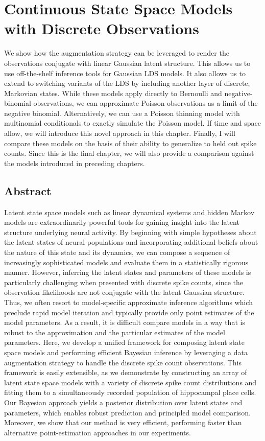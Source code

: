 \chapter{Continuous State Space Models with Discrete Observations}
\label{chap:eight}

We show how the \polyagamma augmentation strategy can be leveraged 
to render the observations conjugate with linear Gaussian latent structure. 
This allows us to use off-the-shelf inference tools for Gaussian LDS 
models. It also allows us to extend to switching variants of the LDS 
by including another layer of discrete, Markovian states. 
While these models apply directly to Bernoulli and negative-binomial 
observations, we can approximate Poisson observations as a limit of the 
negative binomial. Alternatively, we can use a Poisson thinning model with 
multinomial conditionals to exactly simulate the Poisson model. If time 
and space allow, we will introduce this novel approach in this chapter.
Finally, I will compare these models on the basis of their ability to generalize to 
held out spike counts. Since this is the final chapter, we will also 
provide a comparison against the models introduced in preceding chapters.

\section*{Abstract}
Latent state space models such as linear dynamical systems and hidden Markov models 
are extraordinarily powerful tools for gaining insight into the latent 
structure underlying neural activity. By beginning with simple hypotheses about 
the latent states of neural populations and incorporating additional 
beliefs about the nature of this state and its dynamics, we can compose a
sequence of increasingly sophisticated models and evaluate them in a
statistically rigorous manner.
However, inferring the latent states and parameters of these models is
particularly challenging when presented with discrete spike counts, since the
observation likelihoods are not conjugate with the latent Gaussian structure. 
Thus, we often resort to model-specific approximate inference algorithms which preclude 
rapid model iteration and typically provide only point estimates of the model parameters. 
As a result, it is difficult compare models in a way that is robust to the 
approximation and the particular estimates of the model parameters. 
Here, we develop a unified framework for composing latent state space models and 
performing efficient Bayesian inference by leveraging a data augmentation 
strategy to handle the discrete spike count observations. This framework is
easily extensible, as we demonstrate by constructing an array of latent state space models
with a variety of discrete spike count distributions and fitting them to a
simultaneously recorded population of hippocampal place cells.  
Our Bayesian approach yields a posterior distribution over latent states and
parameters, which enables robust prediction and principled model comparison.
Moreover, we show that our method is very efficient, performing faster than
alternative point-estimation approaches in our experiments.
 
